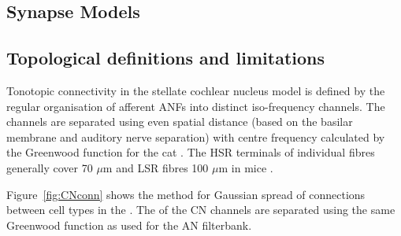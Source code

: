 


\subsection{Synapse Models}




\subsection{Topological definitions and limitations    \label{sec:CN:tonot-conn}}

Tonotopic connectivity in the stellate cochlear nucleus model is defined by the
regular organisation of afferent ANFs into distinct iso-frequency channels.  The
channels are separated using even spatial distance (based on the basilar
membrane and auditory nerve separation) with centre frequency calculated by the
Greenwood function for the cat
\citep[see~\ref{tab:ModelSummary},][]{Greenwood:1990}.  The HSR terminals of
individual fibres generally cover 70 $\mu$m and LSR fibres 100 $\mu$m in mice
\citep{OertelWuEtAl:1988,OertelWu:1989}.


Figure~\ref{fig:CNconn} shows the method for Gaussian spread of connections
between cell types in the \CN\@.  The \CF of the CN channels are separated using
the same Greenwood function as used for the AN filterbank.







